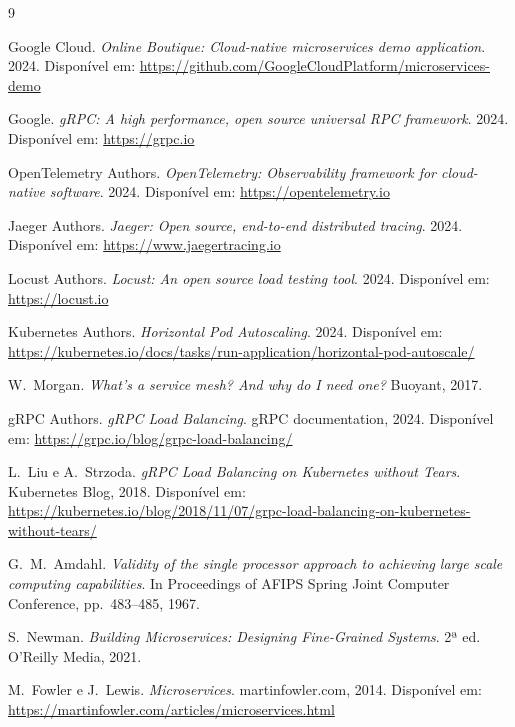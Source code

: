 \documentclass[acmsmall,screen=true,nonacm]{acmart}
\begin{document}

\begin{thebibliography}{9}

Google Cloud. \textit{Online Boutique: Cloud-native microservices demo application}. 2024. Disponível em: \url{https://github.com/GoogleCloudPlatform/microservices-demo}

Google. \textit{gRPC: A high performance, open source universal RPC framework}. 2024. Disponível em: \url{https://grpc.io}

OpenTelemetry Authors. \textit{OpenTelemetry: Observability framework for cloud-native software}. 2024. Disponível em: \url{https://opentelemetry.io}

Jaeger Authors. \textit{Jaeger: Open source, end-to-end distributed tracing}. 2024. Disponível em: \url{https://www.jaegertracing.io}

Locust Authors. \textit{Locust: An open source load testing tool}. 2024. Disponível em: \url{https://locust.io}

Kubernetes Authors. \textit{Horizontal Pod Autoscaling}. 2024. Disponível em: \url{https://kubernetes.io/docs/tasks/run-application/horizontal-pod-autoscale/}

W.\ Morgan. \textit{What's a service mesh? And why do I need one?} Buoyant, 2017.

gRPC Authors. \textit{gRPC Load Balancing}. gRPC documentation, 2024. Disponível em: \url{https://grpc.io/blog/grpc-load-balancing/}

L.\ Liu e A.\ Strzoda. \textit{gRPC Load Balancing on Kubernetes without Tears}. Kubernetes Blog, 2018. Disponível em: \url{https://kubernetes.io/blog/2018/11/07/grpc-load-balancing-on-kubernetes-without-tears/}

G.\ M.\ Amdahl. \textit{Validity of the single processor approach to achieving large scale computing capabilities}. In Proceedings of AFIPS Spring Joint Computer Conference, pp.\ 483--485, 1967.

S.\ Newman. \textit{Building Microservices: Designing Fine-Grained Systems}. 2ª ed. O'Reilly Media, 2021.

M.\ Fowler e J.\ Lewis. \textit{Microservices}. martinfowler.com, 2014. Disponível em: \url{https://martinfowler.com/articles/microservices.html}

\end{thebibliography}
\end{document}
